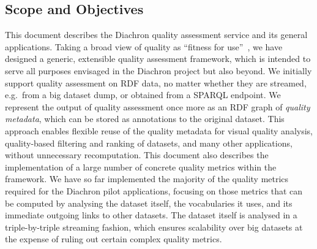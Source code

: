 
\subsection{Scope and Objectives}
\label{sec:ScopeAndObjectives} 

This document describes the Diachron quality assessment service and its general applications.
Taking a broad view of quality as ``fitness for use''~\cite{Juran1974:biblatex}, we have designed a generic, extensible quality assessment framework, which is intended to serve all purposes envisaged in the Diachron project but also beyond.
We initially support quality assessment on RDF data, no matter whether they are streamed, e.g.\ from a big dataset dump, or obtained from a SPARQL endpoint.
We represent the output of quality assessment once more as an RDF graph of \emph{quality metadata}, which can be stored as annotations to the original dataset.
This approach enables flexible reuse of the quality metadata for visual quality analysis, quality-based filtering and ranking of datasets, and many other applications, without unnecessary recomputation.
This document also describes the implementation of a large number of concrete quality metrics within the framework.
We have so far implemented the majority of the quality metrics required for the Diachron pilot applications, focusing on those metrics that can be computed by analysing the dataset itself, the vocabularies it uses, and its immediate outgoing links to other datasets.
The dataset itself is analysed in a triple-by-triple streaming fashion, which ensures scalability over big datasets at the expense of ruling out certain complex quality metrics.

